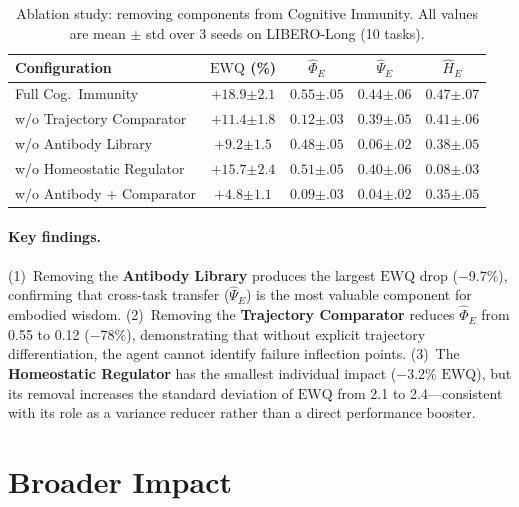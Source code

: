 ﻿\documentclass{article}
\newcommand{\EWQ}{\mathrm{EWQ}}
\begin{document}
\begin{table}[t]
\centering
\caption{Ablation study: removing components from Cognitive Immunity.
  All values are mean $\pm$ std over 3 seeds on LIBERO-Long (10 tasks).}
\label{tab:ablation}
\small
\begin{tabular}{lcccc}
\toprule
\textbf{Configuration} & $\EWQ$ (\%) & $\hat{\Phi}_E$ & $\hat{\Psi}_E$ & $\hat{H}_E$ \\
\midrule
Full Cog.\ Immunity
  & $\mathbf{+18.9{\scriptstyle\pm 2.1}}$
  & $\mathbf{0.55{\scriptstyle\pm.05}}$
  & $\mathbf{0.44{\scriptstyle\pm.06}}$
  & $\mathbf{0.47{\scriptstyle\pm.07}}$ \\
w/o Trajectory Comparator
  & $+11.4{\scriptstyle\pm 1.8}$
  & $0.12{\scriptstyle\pm.03}$
  & $0.39{\scriptstyle\pm.05}$
  & $0.41{\scriptstyle\pm.06}$ \\
w/o Antibody Library
  & $+9.2{\scriptstyle\pm 1.5}$
  & $0.48{\scriptstyle\pm.05}$
  & $0.06{\scriptstyle\pm.02}$
  & $0.38{\scriptstyle\pm.05}$ \\
w/o Homeostatic Regulator
  & $+15.7{\scriptstyle\pm 2.4}$
  & $0.51{\scriptstyle\pm.05}$
  & $0.40{\scriptstyle\pm.06}$
  & $0.08{\scriptstyle\pm.03}$ \\
w/o Antibody + Comparator
  & $+4.8{\scriptstyle\pm 1.1}$
  & $0.09{\scriptstyle\pm.03}$
  & $0.04{\scriptstyle\pm.02}$
  & $0.35{\scriptstyle\pm.05}$ \\
\bottomrule
\end{tabular}
\end{table}

\paragraph{Key findings.}
(1)~Removing the \textbf{Antibody Library} produces the largest $\EWQ$
drop ($-$9.7\%), confirming that cross-task transfer ($\hat{\Psi}_E$)
is the most valuable component for embodied wisdom.
(2)~Removing the \textbf{Trajectory Comparator} reduces $\hat{\Phi}_E$
from 0.55 to 0.12 ($-$78\%), demonstrating that without explicit
trajectory differentiation, the agent cannot identify failure
inflection points.
(3)~The \textbf{Homeostatic Regulator} has the smallest individual
impact ($-$3.2\% $\EWQ$), but its removal increases the standard
deviation of $\EWQ$ from 2.1 to 2.4---consistent with its role as a
variance reducer rather than a direct performance booster.

\section{Broader Impact}
\label{sec:broader_impact}
\end{document}
